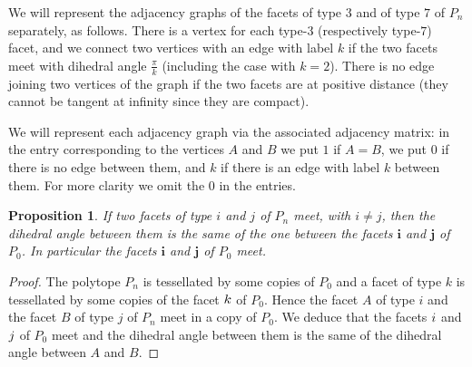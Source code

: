 \documentclass{amsart}
\newtheorem{prop}[lemma]{Proposition}
\theoremstyle{definition}
\theoremstyle{remark}
\begin{document}
We will represent the adjacency graphs of the facets of type $3$ and of type $7$ of $P_n$ separately, as follows.
There is a vertex for each type-$3$ (respectively type-$7$) facet, and we connect two vertices with an edge with label $k$ if the two facets meet with dihedral angle $\frac{\pi}{k}$ (including the case with $k=2$). There is no edge joining two vertices of the graph if the two facets are at positive distance (they cannot be tangent at infinity since they are compact).

We will represent each adjacency graph via the associated adjacency matrix: in the entry corresponding to the vertices $A$ and $B$ we put $1$ if $A=B$, we put $0$ if there is no edge between them, and $k$ if there is an edge with label $k$ between them. For more clarity we omit the $0$ in the entries. %






\begin{prop}
\label{angolo}
    If two facets of type $i$ and $j$ of $P_n$ meet, with $i\ne j$, then the dihedral angle between them is the same of the one between the facets $\textbf{i}$ and $\textbf{j}$ of $P_0$. In particular the facets $\textbf{i}$ and $\textbf{j}$ of $P_0$ meet.
\end{prop}
\begin{proof}
    The polytope $P_n$ is tessellated by some copies of $P_0$ and a facet of type $k$ is tessellated by some copies of the facet $\textit{\textbf{k}}$ of $P_0$. Hence the facet $A$ of type $i$ and the facet $B$ of type $j$ of $P_n$ meet in a copy of $P_0$. We deduce that the facets $\textit{\textbf{i}}$ and $\textit{\textbf{j}}$ of $P_0$ meet and the dihedral angle between them is the same of the dihedral angle between $A$ and $B$. 
\end{proof}
\end{document}
